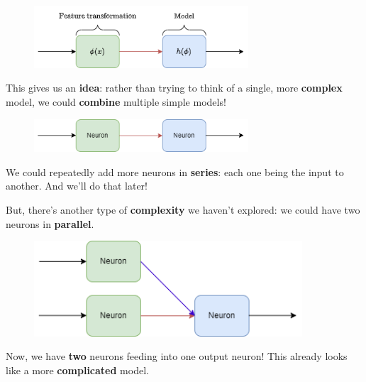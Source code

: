         \begin{figure}[H]
            \centering
            \includegraphics[width=80mm,scale=0.4]{images/nn_images/feature_transform.png}
        \end{figure}
       
        This gives us an \textbf{idea}: rather than trying to think of a single, more \textbf{complex} model, we could \textbf{combine} multiple simple models!
       
        \begin{figure}[H]
        \centering
            \includegraphics[width=80mm,scale=0.4]{images/nn_images/two_neurons.png}
        \end{figure}
        
        We could repeatedly add more neurons in \textbf{series}: each one being the input to another. And we'll do that later!
        
        But, there's another type of \textbf{complexity} we haven't explored: we could have two neurons in \textbf{parallel}.
        
        \begin{figure}[H]
        \centering
            \includegraphics[width=100mm,scale=0.4]{images/nn_images/three_neurons.png}
        \end{figure}
        
        Now, we have \textbf{two} neurons feeding into one output neuron! This already looks like a more \textbf{complicated} model. 
        

